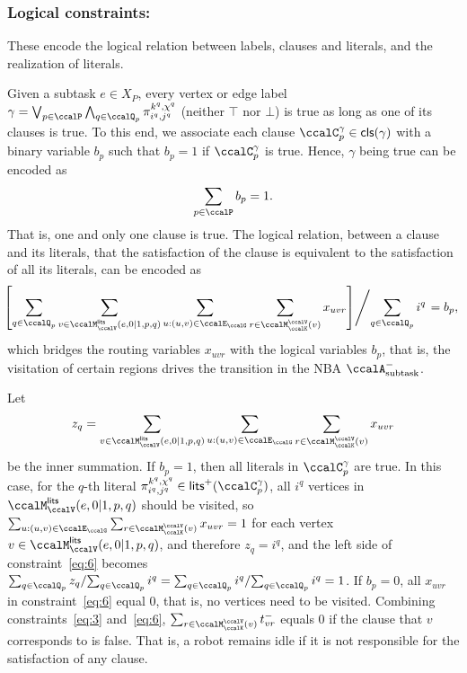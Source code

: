 \documentclass[Afour,sageh,times]{sagej}
\newcommand{\clause}[1]{\mathsf{cls}(#1)}
\newcommand{\auto}[1]{\ccalA_{\textup{#1}}}
\renewcommand{\ap}[3]{\mathcal{\pi}_{{#1},{#2}}^{#3}}
\begin{document}
{  \subsubsection{Logical constraints:}\label{sec:labelconstraints} These encode the logical relation between labels, clauses and literals, and the realization of literals.
                {Given a subtask $e\in X_P$, every vertex or edge label  $\gamma  = \bigvee_{p\in \ccalP} \bigwedge_{q\in \ccalQ_p} \ap{i^q}{j^q}{k^q,\chi^q}$ (neither $\top$ nor $\bot$) is true as long as one of its clauses is true.  To this end, we associate each clause  $\ccalC_{p}^{\gamma} \in \clause{\gamma}$ with a binary variable $b_p$ such that $b_p=1$ if $\ccalC_{p}^{\gamma}$ is true. Hence, $\gamma$ being true can be encoded as
\begingroup\makeatletter\def\f@size{10}\check@mathfonts
\def\maketag@@@#1{\hbox{\m@th\normalsize\normalfont#1}}%
\begin{align}\label{eq:c}
   \sum_{p  \in \ccalP} b_p = 1.
\end{align}
\endgroup
That is, one and only one clause is true. The logical relation, between a clause and its literals, that the satisfaction of the clause is equivalent to the satisfaction of all its literals, can be encoded as
\begingroup\makeatletter\def\f@size{9}\check@mathfonts
\def\maketag@@@#1{\hbox{\m@th\normalsize\normalfont#1}}%
\begin{align}
 \!\!\!  \left. \left[ \sum_{q\in \ccalQ_p} \sum_{v \in \ccalM^\mathsf{lits}_{\ccalV}(e,0|1,p,q)} \sum_{u: (u,v) \in \ccalE_\ccalG} \sum_{r\in \ccalM^\ccalV_{\ccalK}(v)} x_{uvr} \right] \middle/ {\sum_{q\in \ccalQ_p} i^q} \right.= b_p, \label{eq:6}
\end{align}
\endgroup
which bridges the routing variables $x_{uvr}$ with the logical variables $b_p$, that is, the visitation of certain regions drives the transition in the NBA $\auto{subtask}^-$. {Let $$z_{q} = \sum_{v \in \ccalM^\mathsf{lits}_{\ccalV}(e,0|1,p,q)} \sum_{u: (u,v) \in \ccalE_\ccalG} \sum_{r\in \ccalM^\ccalV_{\ccalK}(v)} x_{uvr}$$ be the inner summation. If $b_p=1$, then all literals in $\ccalC_p^{\gamma}$ are true. In this case, for the $q$-th literal $\ap{i^q}{j^q}{k^q,\chi^q} \in \mathsf{lits}^+(\ccalC_p^\gamma)$, all $i^q$ vertices in ${\ccalM^\mathsf{lits}_{\ccalV}(e,0|1,p,q)}$ should be visited, so $\sum_{u: (u,v) \in \ccalE_\ccalG} \sum_{r\in \ccalM^\ccalV_{\ccalK}(v)} x_{uvr} = 1$ for each vertex $v \in {\ccalM^\mathsf{lits}_{\ccalV}(e,0|1,p,q)}$, and therefore $z_{q}= i^q$, and the left side of constraint~\eqref{eq:6} becomes $ \sum_{q\in \ccalQ_p} z_q/ {\sum_{q\in \ccalQ_p} i^q} = {\sum_{q\in \ccalQ_p} i^q}/{\sum_{q\in \ccalQ_p} i^q} = 1 $. If $b_p=0$, all $x_{uvr}$ in constraint~\eqref{eq:6} equal 0, that is, no vertices need to be visited. Combining constraints~\eqref{eq:3} and~\eqref{eq:6}, $\sum_{r\in \ccalM^\ccalV_{\ccalK}(v)} t^-_{vr}$ equals 0 if the  clause that $v$ corresponds to is false. That is, a robot remains idle if it is not responsible for the satisfaction of any clause.

}}}
\end{document}

